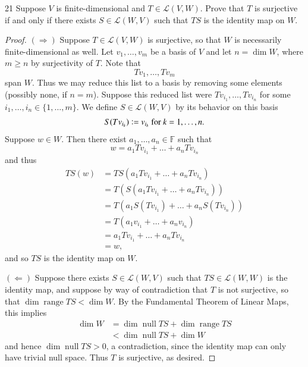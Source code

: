 \documentclass[11pt]{extarticle}
\newenvironment{problem}[1]{\begin{prob*}{#1}{}}{\end{prob*}}
\newcommand{\F}{\mathbb{F}}
\newcommand{\Hom}{\mathcal{L}}
\DeclareMathOperator{\Null}{null}
\DeclareMathOperator{\Range}{range}
\newcommand{\defeq}{\vcentcolon=}
\begin{document}
\begin{problem}{21}
Suppose $V$ is finite-dimensional and $T\in\Hom(V,W)$.  Prove that $T$ is surjective if and only if there exists $S\in\Hom(W,V)$ such that $TS$ is the identity map on $W$.  
\end{problem}
\begin{proof}
$(\Rightarrow)$  Suppose $T\in\Hom(V,W)$ is surjective, so that $W$ is necessarily finite-dimensional as well.  Let $v_1,\dots, v_m$ be a basis of $V$ and let $n=\dim W$, where $m\geq n $ by surjectivity of $T$.  Note that
\begin{equation*}
Tv_1,\dots, Tv_m
\end{equation*}
span $W$.  Thus we may reduce this list to a basis by removing some elements (possibly none, if $n = m$).  Suppose this reduced list were $Tv_{i_1},\dots, Tv_{i_n}$ for some $i_1,\dots, i_n\in\{1,\dots, m\}$.  We define $S\in\Hom(W,V)$ by its behavior on this basis
\begin{align*}
S(Tv_{i_k}) \defeq v_{i_k} \text{ for }k = 1,\dots, n.
\end{align*}
Suppose $w \in W$.  Then there exist $a_1,\dots, a_n\in\F$ such that
\begin{equation*}
w = a_1 Tv_{i_1} + \dots + a_nTv_{i_n}
\end{equation*}
and thus
\begin{align*}
TS(w) &= TS\left(a_1 Tv_{i_1} + \dots + a_nTv_{i_n}\right)\\
&= T\left(S\left( a_1 Tv_{i_1} + \dots + a_nTv_{i_n}\right)\right)\\
&= T\left( a_1 S(Tv_{i_1}) + \dots + a_nS(Tv_{i_n})\right)\\
&= T(a_1 v_{i_1} + \dots + a_nv_{i_n})\\
&= a_1 Tv_{i_1} + \dots + a_nTv_{i_n}\\
&= w,
\end{align*}
and so $TS$ is the identity map on $W$.
\par $(\Leftarrow)$ Suppose there exists $S\in\Hom(W,V)$ such that $TS\in\Hom(W,W)$ is the identity map, and suppose by way of contradiction that $T$ is not surjective, so that $\dim \Range TS < \dim W$.  By the Fundamental Theorem of Linear Maps, this implies
\begin{align*}
\dim W &= \dim\Null TS + \dim \Range TS\\
&< \dim\Null TS + \dim W
\end{align*}
and hence $\dim\Null TS > 0$, a contradiction, since the identity map can only have trivial null space.  Thus $T$ is surjective, as desired.
\end{proof}
\end{document}
